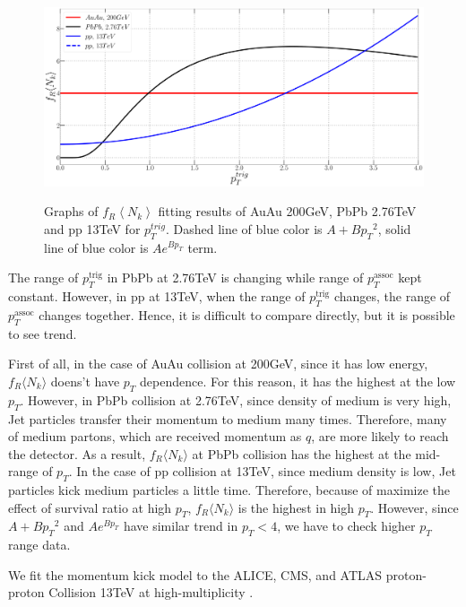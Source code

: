 \documentclass[jkps,fleqn,showpacs,showkeys]{revtex4-2}
\begin{document}
\begin{figure}[ht]
\centering
\includegraphics[width=12cm, height=6cm]{Paper_frnk}
\caption{Graphs of $f_R \left\langle N_k \right\rangle$ fitting results of AuAu 200GeV, PbPb 2.76TeV and pp 13TeV for $p_{T}^{trig}$.
Dashed line of blue color is $A+B{p_T}^2$, solid line of blue color is $Ae^{Bp_T}$ term.}
\label{figure:frnk}
\end{figure}

The range of $p_T^{\text{trig}}$ in PbPb at 2.76TeV is changing while range of $p_T^{\text{assoc}}$ kept constant.
However, in pp at 13TeV, when the range of $p_T^{\text{trig}}$ changes, the range of $p_T^{\text{assoc}}$ changes together.
Hence, it is difficult to compare directly, but it is possible to see trend.

First of all, in the case of AuAu collision at 200GeV, since it has low energy, $f_R \langle N_k \rangle$ doens't have $p_T$ dependence.
For this reason, it has the highest at the low $p_T$.
However, in PbPb collision at 2.76TeV, since density of medium is very high, Jet particles transfer their momentum to medium many times.
Therefore, many of medium partons, which are received momentum as $q$, are more likely to reach the detector.
As a result, $f_R \langle N_k \rangle$ at PbPb collision has the highest at the mid-range of $p_T$.
In the case of pp collision at 13TeV, since medium density is low, Jet particles kick medium particles a little time.
Therefore, because of maximize the effect of survival ratio at high $p_T$, $f_R \langle N_k \rangle$ is the highest in high $p_T$.
However, since $A+B{p_T}^2$ and $Ae^{Bp_T}$ have similar trend in $p_T<4$, we have to check higher $p_T$ range data.

We fit the momentum kick model to the ALICE, CMS, and ATLAS proton-proton Collision 13TeV at high-multiplicity \cite{alice, cms, atlas}. 
\end{document}
